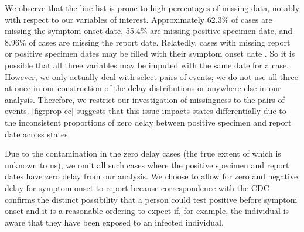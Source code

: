 \documentclass{article}
\begin{document}
We observe that the line list is prone to high percentages of missing data,
notably with respect to our variables of interest. Approximately 62.3\% of cases
are missing the symptom onset date, 55.4\% are missing positive specimen date,
and 8.96\% of cases are missing the report date. Relatedly,
cases with
missing report or positive specimen dates may be filled with their symptom onset date
\citet{jahja2022real}. So it is possible that all three variables may be
imputed with the same date for a case. However, we only actually deal with
select pairs of events; we do not use all three at once in our construction of
the delay distributions or anywhere else in our analysis. Therefore, we restrict
our investigation of missingness to the pairs of events.
\autoref{fig:prop-cc} suggests that this issue impacts states
differentially due to the inconsistent proportions of zero delay between
positive specimen and report date across states. 

Due to the contamination in the zero delay cases (the true extent of which is
unknown to us), we omit all such cases where the positive specimen and report
dates have zero delay from our analysis. We choose to allow for zero and
negative delay for symptom onset to report because correspondence with the CDC
confirms the distinct possibility that a person could test positive before
symptom onset and it is a reasonable ordering to expect if, for example, the
individual is aware that they have been exposed to an infected individual.
\end{document}
